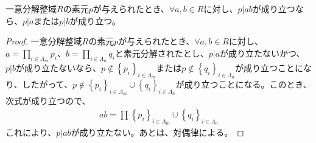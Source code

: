 \documentclass[dvipdfmx]{jsarticle}
\begin{document}
\begin{thm}\label{3.3.5.7}
一意分解整域$R$の素元$p$が与えられたとき、$\forall a,b \in R$に対し、$p|ab$が成り立つなら、$p|a$または$p|b$が成り立つ。
\end{thm}
\begin{proof}
一意分解整域$R$の素元$p$が与えられたとき、$\forall a,b \in R$に対し、$a = \prod_{i \in \varLambda_{m}} p_{i}$、$b = \prod_{i \in \varLambda_{n}} q_{i}$と素元分解されたとし、$p|a$が成り立たないかつ、$p|b$が成り立たないなら、$p \notin \left\{ p_{i} \right\}_{i \in \varLambda_{m}}$または$p \notin \left\{ q_{i} \right\}_{i \in \varLambda_{n}}$が成り立つことになり、したがって、$p \notin \left\{ p_{i} \right\}_{i \in \varLambda_{m}} \cup \left\{ q_{i} \right\}_{i \in \varLambda_{n}}$が成り立つことになる。このとき、次式が成り立つので、
\begin{align*}
ab = \prod_{} {\left\{ p_{i} \right\}_{i \in \varLambda_{m}} \cup \left\{ q_{i} \right\}_{i \in \varLambda_{n}}}
\end{align*}
これにより、$p|ab$が成り立たない。あとは、対偶律による。
\end{proof}
\end{document}
